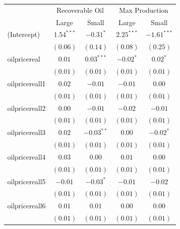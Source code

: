 \documentclass[12pt]{article}
\begin{document}
\begin{table}
\begin{center}
\begin{tabular}{l c c c c }
\hline
&\multicolumn{2}{c}{Recoverable Oil} & \multicolumn{2}{c}{Max Production} \\
                                    & Large & Small & Large & Small \\
\hline
(Intercept)                         & $1.54^{***}$  & $-0.31^{*}$   & $2.25^{***}$  & $-1.61^{***}$ \\
                                    & $(0.06)$      & $(0.14)$      & $(0.08)$      & $(0.25)$      \\
oilpricereal                      & $0.01$        & $0.03^{***}$  & $-0.02^{*}$   & $0.02^{*}$    \\
                                    & $(0.01)$      & $(0.01)$      & $(0.01)$      & $(0.01)$      \\
oilpricereall1                   & $0.02$        & $-0.01$       & $-0.01$       & $0.00$        \\
                                    & $(0.01)$      & $(0.01)$      & $(0.01)$      & $(0.01)$      \\
oilpricereall2                   & $0.00$        & $-0.01$       & $-0.02$       & $-0.01$       \\
                                    & $(0.01)$      & $(0.01)$      & $(0.01)$      & $(0.01)$      \\
oilpricereall3                   & $0.02$        & $-0.03^{**}$  & $0.00$        & $-0.02^{*}$   \\
                                    & $(0.01)$      & $(0.01)$      & $(0.01)$      & $(0.01)$      \\
oilpricereall4                   & $0.03$        & $0.00$        & $0.01$        & $0.00$        \\
                                    & $(0.01)$      & $(0.01)$      & $(0.01)$      & $(0.01)$      \\
oilpricereall5                   & $-0.01$       & $-0.03^{*}$   & $-0.01$       & $-0.02$       \\
                                    & $(0.01)$      & $(0.01)$      & $(0.01)$      & $(0.01)$      \\
oilpricereall6                   & $0.01$        & $0.01$        & $0.00$        & $0.00$        \\
                                    & $(0.01)$      & $(0.01)$      & $(0.01)$      & $(0.01)$      \\

\end{tabular}
\end{center}
\end{table}
\end{document}
